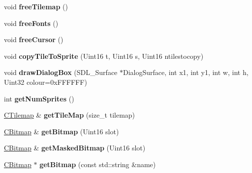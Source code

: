 \begin{DoxyCompactItemize}
\item 
\hypertarget{class_c_gfx_engine_ad1eec0b248f229d01d208c2e74a62cea}{
void {\bfseries freeTilemap} ()}
\label{class_c_gfx_engine_ad1eec0b248f229d01d208c2e74a62cea}

\item 
\hypertarget{class_c_gfx_engine_a0639424538cc46322160af86a1c3db7f}{
void {\bfseries freeFonts} ()}
\label{class_c_gfx_engine_a0639424538cc46322160af86a1c3db7f}

\item 
\hypertarget{class_c_gfx_engine_a07c0654c7a76d57d1b4e6dac3fa1f5ef}{
void {\bfseries freeCursor} ()}
\label{class_c_gfx_engine_a07c0654c7a76d57d1b4e6dac3fa1f5ef}

\item 
\hypertarget{class_c_gfx_engine_a74bdf51ea227c59815fea7d9a6910821}{
void {\bfseries copyTileToSprite} (Uint16 t, Uint16 s, Uint16 ntilestocopy)}
\label{class_c_gfx_engine_a74bdf51ea227c59815fea7d9a6910821}

\item 
\hypertarget{class_c_gfx_engine_a06d9ce9b8384aba26608dd7d4e0143dd}{
void {\bfseries drawDialogBox} (SDL\_\-Surface $\ast$DialogSurface, int x1, int y1, int w, int h, Uint32 colour=0xFFFFFF)}
\label{class_c_gfx_engine_a06d9ce9b8384aba26608dd7d4e0143dd}

\item 
\hypertarget{class_c_gfx_engine_a83287c1e00ecaa065da179b34483599b}{
int {\bfseries getNumSprites} ()}
\label{class_c_gfx_engine_a83287c1e00ecaa065da179b34483599b}

\item 
\hypertarget{class_c_gfx_engine_aded18ea84816faff1738fda1e26706b4}{
\hyperlink{class_c_tilemap}{CTilemap} \& {\bfseries getTileMap} (size\_\-t tilemap)}
\label{class_c_gfx_engine_aded18ea84816faff1738fda1e26706b4}

\item 
\hypertarget{class_c_gfx_engine_a90e89e34650d89985747fbcbb6b5149e}{
\hyperlink{class_c_bitmap}{CBitmap} \& {\bfseries getBitmap} (Uint16 slot)}
\label{class_c_gfx_engine_a90e89e34650d89985747fbcbb6b5149e}

\item 
\hypertarget{class_c_gfx_engine_a297250e8461190b21a02d91c8a7a7561}{
\hyperlink{class_c_bitmap}{CBitmap} \& {\bfseries getMaskedBitmap} (Uint16 slot)}
\label{class_c_gfx_engine_a297250e8461190b21a02d91c8a7a7561}

\item 
\hypertarget{class_c_gfx_engine_a11beb70ffb01a4d8a7d9ede6ce043868}{
\hyperlink{class_c_bitmap}{CBitmap} $\ast$ {\bfseries getBitmap} (const std::string \&name)}
\label{class_c_gfx_engine_a11beb70ffb01a4d8a7d9ede6ce043868}


\end{DoxyCompactItemize}

